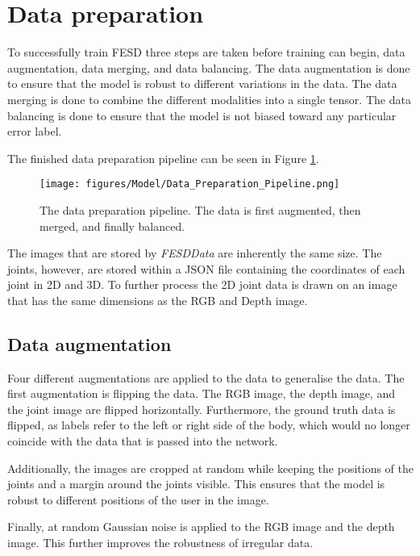 \section{Data preparation}
\label{sec:data_preparation}

To successfully train FESD three steps are taken before training can begin, data augmentation, data merging, and data balancing. The data augmentation is done to ensure that the model is robust to different variations in the data. The data merging is done to combine the different modalities into a single tensor. The data balancing is done to ensure that the model is not biased toward any particular error label.

The finished data preparation pipeline can be seen in Figure \ref{fig:data_preparation_pipeline}.

\begin{figure}
  \centering
  \texttt{[image: figures/Model/Data\_Preparation\_Pipeline.png]}
  \caption[Data preparation pipeline]{The data preparation pipeline. The data is first augmented, then merged, and finally balanced.}
  \label{fig:data_preparation_pipeline}
\end{figure}

The images that are stored by \textit{FESDData} are inherently the same size. The joints, however, are stored within a JSON file containing the coordinates of each joint in 2D and 3D. To further process the 2D joint data is drawn on an image that
 has the same dimensions as the RGB and Depth image.

\subsection{Data augmentation}

Four different augmentations are applied to the data to generalise the data. The first augmentation is flipping the data. The RGB image, the depth image, and the joint image are flipped horizontally. Furthermore, the ground truth data is flipped, as labels refer to the left or right side of the body, which would no longer coincide with the data that is passed into the network.

Additionally, the images are cropped at random while keeping the positions of the joints and a margin around the joints visible. This ensures that the model is robust to different positions of the user in the image. 

Finally, at random Gaussian noise is applied to the RGB image and the depth image. This further improves the robustness of irregular data.

